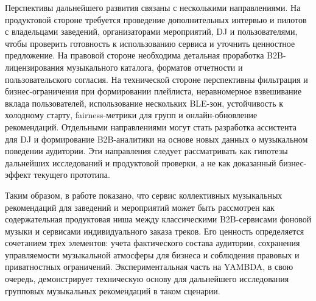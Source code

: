Перспективы дальнейшего развития связаны с несколькими направлениями. На продуктовой стороне требуется проведение дополнительных интервью и пилотов с владельцами заведений, организаторами мероприятий, DJ и пользователями, чтобы проверить готовность к использованию сервиса и уточнить ценностное предложение. На правовой стороне необходима детальная проработка B2B-лицензирования музыкального каталога, форматов отчетности и пользовательского согласия. На технической стороне перспективны фильтрация и бизнес-ограничения при формировании плейлиста, неравномерное взвешивание вклада пользователей, использование нескольких BLE-зон, устойчивость к холодному старту, fairness-метрики для групп и онлайн-обновление рекомендаций. Отдельными направлениями могут стать разработка ассистента для DJ и формирование B2B-аналитики на основе новых данных о музыкальном поведении аудитории. Эти направления следует рассматривать как гипотезы дальнейших исследований и продуктовой проверки, а не как доказанный бизнес-эффект текущего прототипа.

Таким образом, в работе показано, что сервис коллективных музыкальных рекомендаций для заведений и мероприятий может быть рассмотрен как содержательная продуктовая ниша между классическими B2B-сервисами фоновой музыки и сервисами индивидуального заказа треков. Его ценность определяется сочетанием трех элементов: учета фактического состава аудитории, сохранения управляемости музыкальной атмосферы для бизнеса и соблюдения правовых и приватностных ограничений. Экспериментальная часть на YAMBDA, в свою очередь, демонстрирует техническую основу для дальнейшего исследования групповых музыкальных рекомендаций в таком сценарии.
